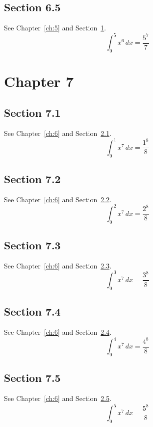 \documentclass{book}
\begin{document}
\section{Section 6.5}\label{sec:6-5}
See Chapter~\ref{ch:5} and Section~\ref{sec:6-5}.
\lipsum[36-38]
\begin{equation}\label{eq:6-5} \int_0^{5} x^{6}\,dx = \frac{5^{7}}{7}\end{equation}
\chapter{Chapter 7}\label{ch:7}
\section{Section 7.1}\label{sec:7-1}
See Chapter~\ref{ch:6} and Section~\ref{sec:7-1}.
\lipsum[37-39]
\begin{equation}\label{eq:7-1} \int_0^{1} x^{7}\,dx = \frac{1^{8}}{8}\end{equation}
\section{Section 7.2}\label{sec:7-2}
See Chapter~\ref{ch:6} and Section~\ref{sec:7-2}.
\lipsum[38-40]
\begin{equation}\label{eq:7-2} \int_0^{2} x^{7}\,dx = \frac{2^{8}}{8}\end{equation}
\section{Section 7.3}\label{sec:7-3}
See Chapter~\ref{ch:6} and Section~\ref{sec:7-3}.
\lipsum[39-41]
\begin{equation}\label{eq:7-3} \int_0^{3} x^{7}\,dx = \frac{3^{8}}{8}\end{equation}
\section{Section 7.4}\label{sec:7-4}
See Chapter~\ref{ch:6} and Section~\ref{sec:7-4}.
\lipsum[40-42]
\begin{equation}\label{eq:7-4} \int_0^{4} x^{7}\,dx = \frac{4^{8}}{8}\end{equation}
\section{Section 7.5}\label{sec:7-5}
See Chapter~\ref{ch:6} and Section~\ref{sec:7-5}.
\lipsum[41-43]
\begin{equation}\label{eq:7-5} \int_0^{5} x^{7}\,dx = \frac{5^{8}}{8}\end{equation}
\end{document}
